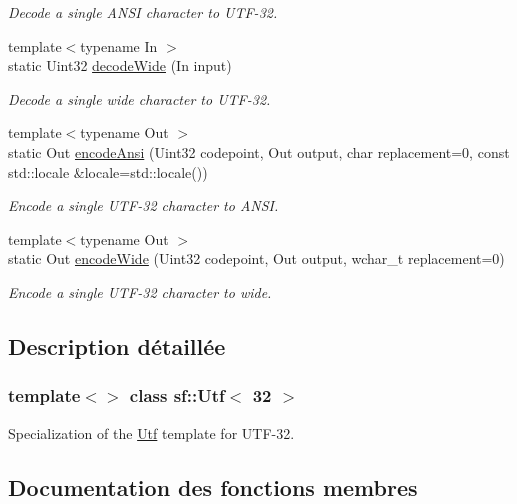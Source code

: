 \begin{DoxyCompactItemize}
\begin{DoxyCompactList}\small\item\em Decode a single A\+N\+SI character to U\+T\+F-\/32. \end{DoxyCompactList}\item 
{\footnotesize template$<$typename In $>$ }\\static Uint32 \hyperlink{classsf_1_1Utf_3_0132_01_4_a043fe25f5f4dbc205e78e6f1d99840dc}{decode\+Wide} (In input)
\begin{DoxyCompactList}\small\item\em Decode a single wide character to U\+T\+F-\/32. \end{DoxyCompactList}\item 
{\footnotesize template$<$typename Out $>$ }\\static Out \hyperlink{classsf_1_1Utf_3_0132_01_4_af6590226a071076ca22d818573a16ded}{encode\+Ansi} (Uint32 codepoint, Out output, char replacement=0, const std\+::locale \&locale=std\+::locale())
\begin{DoxyCompactList}\small\item\em Encode a single U\+T\+F-\/32 character to A\+N\+SI. \end{DoxyCompactList}\item 
{\footnotesize template$<$typename Out $>$ }\\static Out \hyperlink{classsf_1_1Utf_3_0132_01_4_a52e511e74ddc5df1bbf18f910193bc47}{encode\+Wide} (Uint32 codepoint, Out output, wchar\+\_\+t replacement=0)
\begin{DoxyCompactList}\small\item\em Encode a single U\+T\+F-\/32 character to wide. \end{DoxyCompactList}\end{DoxyCompactItemize}


\subsection{Description détaillée}
\subsubsection*{template$<$$>$\newline
class sf\+::\+Utf$<$ 32 $>$}

Specialization of the \hyperlink{classsf_1_1Utf}{Utf} template for U\+T\+F-\/32. 

\subsection{Documentation des fonctions membres}
\mbox{\label{classsf_1_1Utf_3_0132_01_4_a9b18c32b9e6d4b3126e9b4af45988b55}} 
